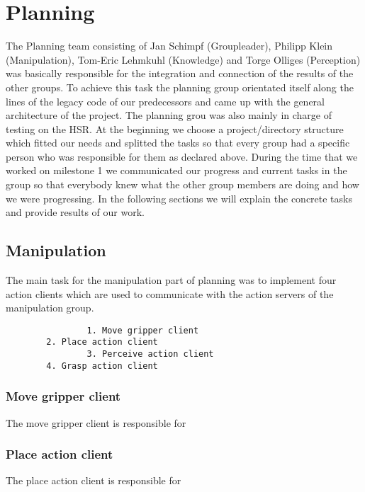 \documentclass[main.tex]{subfiles}
\begin{document}
	
	\chapter{Planning}
	
	 The Planning team consisting of Jan Schimpf (Groupleader), Philipp Klein (Manipulation), Tom-Eric Lehmkuhl (Knowledge) and Torge Olliges (Perception) was basically responsible for the integration and connection of the results of the other groups. To achieve this task the planning group orientated itself along the lines of the legacy code of our predecessors and came up with the general architecture of the project. The planning grou was also mainly in charge of testing on the HSR. At the beginning we choose a project/directory structure which fitted our needs and splitted the tasks so that every group had a specific person who was responsible for them as declared above. During the time that we worked on milestone 1 we communicated our progress and current tasks in the group so that everybody knew what the other group members are doing and how we were progressing. In the following sections we will explain the concrete tasks and provide results of our work.

\section{Manipulation}

                The main task for the manipulation part of planning was to implement four action clients which are used to communicate with the action servers of the manipulation group.
		\begin{lstlisting}
                1. Move gripper client
		2. Place action client
                3. Perceive action client
		4. Grasp action client
		\end{lstlisting}

		\subsection{Move gripper client}

		The move gripper client is responsible for

		\subsection{Place action client}

                The place action client is responsible for
\end{document}
